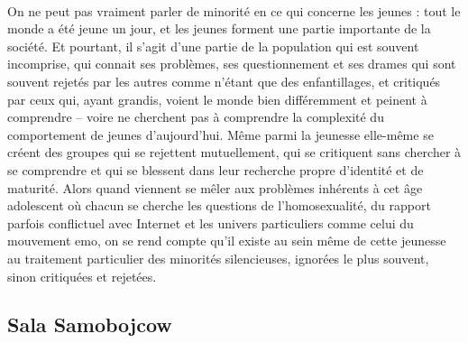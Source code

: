 \documentclass[12pt]{amsart}
\begin{document}
\paragraph{}
On ne peut pas vraiment parler de minorité en ce qui concerne les jeunes : tout le monde a été jeune un jour, et les jeunes forment une partie importante de la société. Et pourtant, il s’agit d’une partie de la population qui est souvent incomprise, qui connait ses problèmes, ses questionnement et ses drames qui sont souvent rejetés par les autres comme n’étant que des enfantillages, et critiqués par ceux qui, ayant grandis, voient le monde bien différemment et peinent à comprendre – voire ne cherchent pas à comprendre la complexité du comportement de jeunes d’aujourd’hui. Même parmi la jeunesse elle-même se créent des groupes qui se rejettent mutuellement, qui se critiquent sans chercher à se comprendre et qui se blessent dans leur recherche propre d’identité et de maturité. Alors quand viennent se mêler aux problèmes inhérents à cet âge adolescent où chacun se cherche les questions de l’homosexualité, du rapport parfois conflictuel avec Internet et les univers particuliers comme celui du mouvement emo, on se rend compte qu’il existe au sein même de cette jeunesse au traitement particulier des minorités silencieuses, ignorées le plus souvent, sinon critiquées et rejetées.

\subsection*{Sala Samobojcow}
\end{document}
